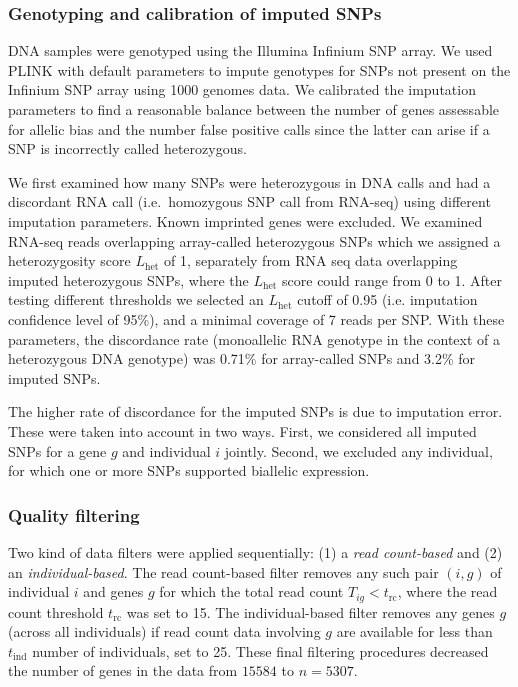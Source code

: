 \documentclass[12pt,letterpaper]{article}
\begin{document}
\subsubsection{Genotyping and calibration of imputed SNPs}

DNA samples were genotyped using the Illumina Infinium SNP array. We used
PLINK with default parameters to impute genotypes for SNPs not present on the
Infinium SNP array using 1000 genomes data.  We calibrated the
imputation parameters to find a reasonable balance between the number of genes
assessable for allelic bias and the number false positive
calls since the latter can arise if a SNP is
incorrectly called heterozygous.

We first examined how many SNPs were heterozygous in DNA calls and had a
discordant RNA call (i.e.~homozygous SNP call from RNA-seq) using different imputation
parameters. Known imprinted genes were excluded. We examined RNA-seq reads
overlapping array-called heterozygous SNPs which we assigned a heterozygosity
score \(L_\mathrm{het}\) of 1, separately from RNA seq data
overlapping imputed heterozygous SNPs, where the \(L_\mathrm{het}\) score could
range from 0 to 1.  After testing different thresholds
we selected an \(L_\mathrm{het}\) cutoff of 0.95 (i.e. imputation confidence
level of 95\%), and a minimal coverage of 7 reads per SNP. With these
parameters, the discordance rate (monoallelic RNA genotype in the context of a
heterozygous DNA genotype) was 0.71\% for array-called SNPs and 3.2\% for
imputed SNPs.

The higher rate of discordance for the imputed SNPs
is due to imputation error.  These were taken into
account in two ways.
First, we considered all imputed SNPs for a gene \(g\) and individual \(i\)
jointly.  Second, we excluded
any individual, for which one or more SNPs supported biallelic
expression.


\subsubsection{Quality filtering}

\label{sec:filtering}

Two kind of data filters were applied sequentially: (1) a \emph{read
count-based} and (2) an \emph{individual-based}.  The read count-based filter
removes any such pair $(i,g)$ of individual $i$ and genes $g$ for which the
total read count $T_{ig}<t_\mathrm{rc}$, where the read count threshold
$t_\mathrm{rc}$ was set to 15. The individual-based filter removes any genes
$g$ (across all individuals) if read count data involving $g$ are available
for less than $t_\mathrm{ind}$ number of individuals, set to 25.
These final filtering procedures decreased the number of genes in the data from
\(15584\) to \(n=5307\).
\end{document}
